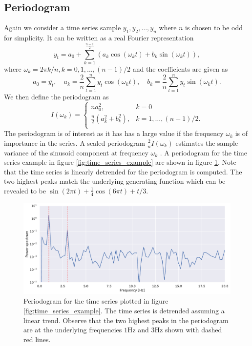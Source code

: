 \documentclass[a4paper, 10pt]{memoir}
\theoremstyle{plain}
\theoremstyle{definition}
\theoremstyle{remark}
\begin{document}
\subsection{Periodogram}
Again we consider a time series sample $y_1, y_2, \hdots, y_n$ where $n$ is chosen to be odd for simplicity.
It can be written as a real Fourier representation 
\begin{equation*}
        y_t = a_0 + \sum_{k = 1}^{\frac{n-1}{2}} (a_k \cos(\omega_k t) + b_k \sin (\omega_kt)),
\end{equation*}
where $\omega_k = 2\pi k / n, k =0, 1, \hdots, (n -1)/2$ and the coefficients are given as 
\begin{equation*}
        a_0 = \bar{y_t}, \quad a_k = \frac{2}{n}\sum_{t = 1}^{n}y_t \cos(\omega_kt), \quad b_k = \frac{2}{n} \sum_{ t = 1}^{n} y_t \sin (\omega_kt).
\end{equation*}
We then define the periodogram as 
\begin{equation}\label{eq:periodogram}
        I(\omega_k) = 
                \begin{cases}
                        na_0^2, & k=0  \\
                        \frac{n}{2}(a_k^2 + b_k^2), & k = 1, \hdots, (n-1)/2. \\
                \end{cases}
\end{equation}
The periodogram is of interest as it has has a large value if the frequency $\omega_k$ is of importance in the series.
A scaled periodogram $\frac{2}{n}I(\omega_k)$ estimates the sample variance of the sinusoid component at frequency $\omega_k$ \cite{shumway}.
A periodogram for the time series example in figure \ref{fig:time_series_example} are shown in figure \ref{fig:periodogram_basic}.
Note that the time series is linearly detrended for the periodogram is computed.
The two highest peaks match the underlying generating function which can be revealed to be $\sin(2\pi t) + \frac{1}{4} \cos(6 \pi t) + t / 3$.

\begin{figure}[tb]
        \centering
        \includegraphics[width=\linewidth]{./code/figures/periodogram_basic.pdf}
        \caption{Periodogram for the time series plotted in figure \ref{fig:time_series_example}.
        The time series is detrended assuming a linear trend.
        Observe that the two highest peaks in the periodogram are at the underlying frequencies $1$Hz and $3$Hz shown with dashed red lines.}
        \label{fig:periodogram_basic}
\end{figure}
\end{document}
